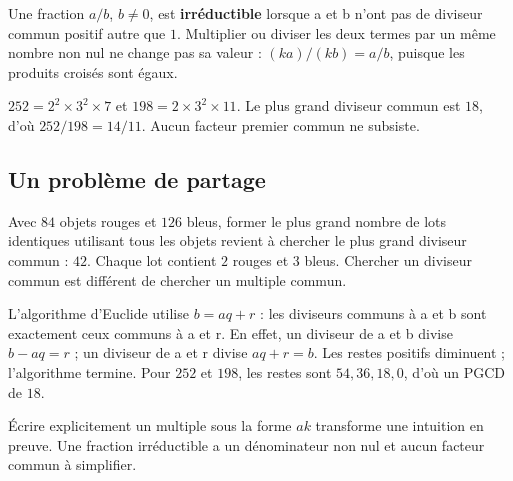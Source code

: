\documentclass[../cours_2de.tex]{subfiles}
\begin{document}
Une fraction $a/b$, $b\ne0$, est \textbf{irréductible} lorsque a et b n'ont pas de diviseur commun positif autre que $1$. Multiplier ou diviser les deux termes par un même nombre non nul ne change pas sa valeur : $(ka)/(kb)=a/b$, puisque les produits croisés sont égaux.
\begin{exemple}
$252=2^2\times3^2\times7$ et $198=2\times3^2\times11$. Le plus grand diviseur commun est $18$, d'où $252/198=14/11$. Aucun facteur premier commun ne subsiste.
\end{exemple}
\begin{finchapitre}
\section{Un problème de partage}
Avec $84$ objets rouges et $126$ bleus, former le plus grand nombre de lots identiques utilisant tous les objets revient à chercher le plus grand diviseur commun : $42$. Chaque lot contient $2$ rouges et $3$ bleus. Chercher un diviseur commun est différent de chercher un multiple commun.

\approfondissement L'algorithme d'Euclide utilise $b=aq+r$ : les diviseurs communs à a et b sont exactement ceux communs à a et r. En effet, un diviseur de a et b divise $b-aq=r$ ; un diviseur de a et r divise $aq+r=b$. Les restes positifs diminuent ; l'algorithme termine. Pour $252$ et $198$, les restes sont $54,36,18,0$, d'où un PGCD de $18$.
\begin{retenir}
Écrire explicitement un multiple sous la forme $ak$ transforme une intuition en preuve. Une fraction irréductible a un dénominateur non nul et aucun facteur commun à simplifier.
\end{retenir}
\end{finchapitre}
\end{document}
